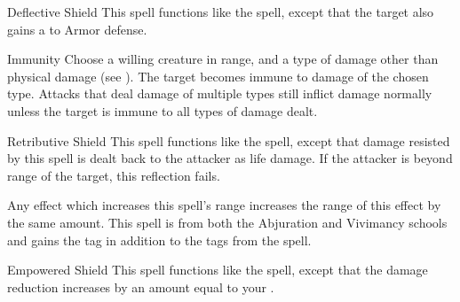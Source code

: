 \lowercase{\hypertarget{spell:Deflective Shield}{}}\label{spell:Deflective Shield}
\begin{ability}[\nth{3}]{\hypertarget{spell:Deflective Shield}{Deflective Shield}}
This spell functions like the  spell, except that the target also gains a   to Armor defense.
\end{ability}
\vspace{0.25em}



\lowercase{\hypertarget{spell:Immunity}{}}\label{spell:Immunity}
\begin{ability}[\nth{3}]{\hypertarget{spell:Immunity}{Immunity}}
Choose a willing creature in \rngclose range, and a type of damage other than physical damage (see ).
The target becomes immune to damage of the chosen type.
Attacks that deal damage of multiple types still inflict damage normally unless the target is immune to all types of damage dealt.
\end{ability}
\vspace{0.25em}



\lowercase{\hypertarget{spell:Retributive Shield}{}}\label{spell:Retributive Shield}
\begin{ability}[\nth{3}]{\hypertarget{spell:Retributive Shield}{Retributive Shield}}
This spell functions like the  spell, except that damage resisted by this spell is dealt back to the attacker as life damage.
If the attacker is beyond \rngclose range of the target, this reflection fails.

Any effect which increases this spell's range increases the range of this effect by the same amount.
This spell is from both the Abjuration and Vivimancy schools and gains the  tag in addition to the tags from the  spell.
\end{ability}
\vspace{0.25em}



\lowercase{\hypertarget{spell:Empowered Shield}{}}\label{spell:Empowered Shield}
\begin{ability}[\nth{4}]{\hypertarget{spell:Empowered Shield}{Empowered Shield}}
This spell functions like the  spell, except that the damage reduction increases by an amount equal to your .
\end{ability}
\vspace{0.25em}



